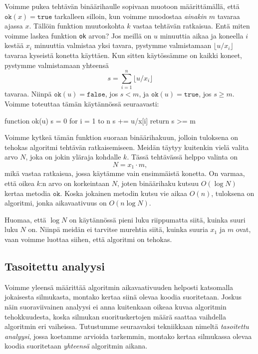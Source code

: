 Voimme pukea tehtävän binäärihaulle sopivaan muotoon määrittämällä,
että $\texttt{ok}(x)=\texttt{true}$ tarkalleen silloin, kun voimme muodostaa
\emph{ainakin} $m$ tavaraa ajassa $x$.
Tällöin funktion muutoskohta $k$ vastaa tehtävän ratkaisua.
Entä miten voimme laskea funktion \texttt{ok} arvon?
Jos meillä on $u$ minuuttia aikaa ja koneella $i$ kestää $x_i$
minuuttia valmistaa yksi tavara, pystymme valmistamaan
$\lfloor u/x_i \rfloor$ tavaraa kyseistä konetta käyttäen.
Kun sitten käytössämme on kaikki koneet,
pystymme valmistamaan yhteensä
\[ s = \sum_{i=1}^n \lfloor u/x_i \rfloor \]
tavaraa. Niinpä $\texttt{ok}(u)=\texttt{false}$, jos $s<m$,
ja $\texttt{ok}(u)=\texttt{true}$, jos $s \ge m$.
Voimme toteuttaa tämän käytännössä seuraavasti:

\begin{code}
function ok(u)
    s = 0
    for i = 1 to n
        s += u/x[i]
    return s >= m
\end{code}

Voimme kytkeä tämän funktion suoraan binäärihakuun,
jolloin tuloksena on tehokas algoritmi tehtävän ratkaisemiseen.
Meidän täytyy kuitenkin vielä valita arvo $N$,
joka on jokin yläraja kohdalle $k$.
Tässä tehtävässä helppo valinta on
\[N = x_1 \cdot m,\]
mikä vastaa ratkaisua, jossa käytämme vain ensimmäistä konetta.
On varmaa, että oikea $k$:n arvo on korkeintaan $N$,
joten binäärihaku kutsuu $O(\log N)$ kertaa metodia $\texttt{ok}$.
Koska jokainen metodin kutsu vie aikaa $O(n)$,
tuloksena on algoritmi, jonka aikavaativuus on $O(n \log N)$.

Huomaa, että $\log N$ on käytännössä pieni luku riippumatta
siitä, kuinka suuri luku $N$ on.
Niinpä meidän ei tarvitse murehtia siitä,
kuinka suuria $x_1$ ja $m$ ovat,
vaan voimme luottaa siihen, että algoritmi on tehokas.

\subsection{Tasoitettu analyysi}

Voimme yleensä määrittää algoritmin aikavaativuuden
helposti katsomalla jokaisesta silmukasta,
montako kertaa siinä olevaa koodia suoritetaan.
Joskus näin suoraviivainen analyysi ei anna kuitenkaan
oikeaa kuvaa algoritmin tehokkuudesta,
koska silmukan suorituskertojen määrä saattaa vaihdella
algoritmin eri vaiheissa.
Tutustumme seuraavaksi tekniikkaan nimeltä
\emph{tasoitettu analyysi}, jossa koetamme arvioida tarkemmin,
montako kertaa silmukassa olevaa koodia suoritetaan
\emph{yhteensä} algoritmin aikana.

